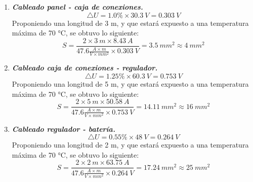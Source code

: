 \begin{enumerate}
	\item \textbf{\textit{Cableado panel - caja de conexiones.}}
	\begin{equation}\label{eq:ecu32}
	\bigtriangleup U = 1.0 \% \times 30.3 \ V = 0.303 \ V
	\end{equation}
	Proponiendo una longitud de 3 m, y que estará expuesto a una temperatura máxima de 70 °C, se obtuvo lo siguiente:
	\begin{equation}\label{eq:ecu31sust}
	S = \frac{2 \times 3 \ m \times 8.43 \ A}{47.6 \frac{A \times m}{V \times mm ^{2}} \times 0.303 \ V}=3.5 \ mm ^{2} \approx 4 \ mm ^{2}
	\end{equation}
	\item \textbf{\textit{Cableado caja de conexiones - regulador.}}
	\begin{equation}\label{eq:ecu32su}
	\bigtriangleup U = 1.25 \% \times 60.3 \ V = 0.753 \ V
	\end{equation}
	Proponiendo una longitud de 5 m, y que estará expuesto a una temperatura máxima de 70 °C, se obtuvo lo siguiente:
	\begin{equation}\label{eq:ecu31sust1}
	S = \frac{2 \times 5 \ m \times 50.58 \ A}{47.6 \frac{A \times m}{V \times mm ^{2}} \times 0.753 \ V}=14.11 \ mm ^{2} \approx 16 \ mm ^{2}
	\end{equation}
	\item \textbf{\textit{Cableado regulador - batería.}}
	\begin{equation}\label{eq:ecu32s}
	\bigtriangleup U = 0.55 \% \times 48 \ V = 0.264 \ V
	\end{equation}
	Proponiendo una longitud de 2 m, y que estará expuesto a una temperatura máxima de 70 °C, se obtuvo lo siguiente:
	\begin{equation}\label{eq:ecu31s}
	S = \frac{2 \times 2 \ m \times 63.75 \ A}{47.6 \frac{A \times m}{V \times mm ^{2}} \times 0.264 \ V}=17.24 \ mm ^{2} \approx 25 \ mm ^{2}
	\end{equation}
	

\end{enumerate}
